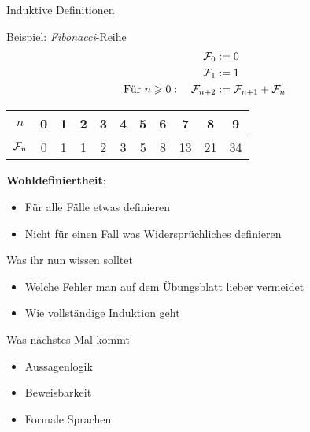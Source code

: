 \newcommand{\Fib}{\mathcal{F}\hspace{-1pt}}

\begin{frame}{Induktive Definitionen}
	\begin{exampleblock}{Beispiel: \emph{Fibonacci}-Reihe}
		\begin{align*}
		\Fib_0 &:= 0 \\
		\Fib_1 &:= 1 \\
		\text{Für } n \geq 0: \quad \Fib_{n+2} &:= \Fib_{n+1} + \Fib_n 		
		\end{align*}
		\pause
		\begin{table}
			\centering
			\begin{tabular}{|c|c|c|c|c|c|c|c|c|c|c|}
				\hline
				$n$ & 0 & 1 & 2 & 3 & 4 & 5 & 6 & 7 & 8 & 9 \\ \hline
				$\Fib_n$ & 0 & 1 & 1 & 2 & 3 & 5 & 8 & 13 & 21 & 34 \\ \hline
			\end{tabular}
		\end{table}
		
		\pause
		\textbf{Wohldefiniertheit}: 
		\begin{itemize}
			\item Für alle Fälle etwas definieren 
			\item Nicht für einen Fall was Widersprüchliches definieren
		\end{itemize}
		
	\end{exampleblock}
	
\end{frame}



%

%

\begin{frame}	
	\begin{block}{Was ihr nun wissen solltet}
		\begin{itemize}
			\item Welche Fehler man auf dem Übungsblatt lieber vermeidet \smiley
			\item Wie vollständige Induktion geht
		\end{itemize}
	\end{block}
	
	\begin{block}{Was nächstes Mal kommt}
		\begin{itemize}
			\item Aussagenlogik
			\item Beweisbarkeit
			\item Formale Sprachen
		\end{itemize}
	\end{block}
\end{frame}

\slideThanks


